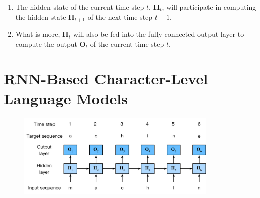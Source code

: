 \begin{enumerate}
\begin{enumerate}
        \item The hidden state of the current time step $t$, $\mathbf{H}_t$, will participate in computing the hidden state $\mathbf{H}_{t+1}$ of the next time step $t+1$.
        
        \item What is more, $\mathbf{H}_t$ will also be fed into the fully connected output layer to compute the output $\mathbf{O}_t$ of the current time step $t$.
    \end{enumerate}
\end{enumerate}


\section{RNN-Based Character-Level Language Models \cite{dnn-1}}

\begin{figure}[H]
    \centering
    \includegraphics[width=\linewidth, height=4cm, keepaspectratio]{Pictures/Recurrent-Neural-Networks/rnn-char-lm.jpg}
\end{figure}



